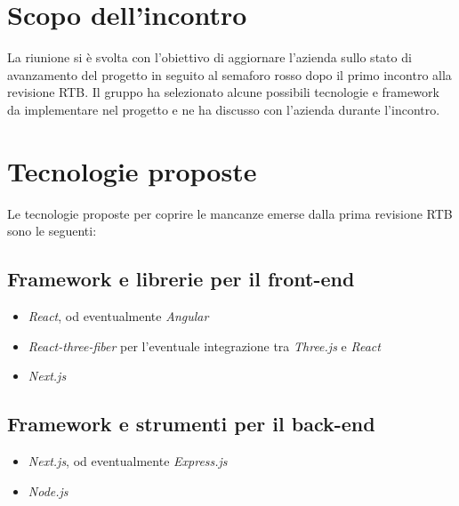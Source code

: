 \section{Scopo dell'incontro} \label{sec:scopo}
La riunione si è svolta con l'obiettivo di aggiornare l'azienda \nomeAzienda \space sullo stato di avanzamento del progetto in seguito al semaforo rosso dopo il primo incontro alla revisione RTB. Il gruppo ha selezionato alcune possibili tecnologie e framework da implementare nel progetto e ne ha discusso con l'azienda durante l'incontro.

\section{Tecnologie proposte} \label{sec:argomenti}
\noindent Le tecnologie proposte per coprire le mancanze emerse dalla prima revisione RTB sono le seguenti:
\subsection{Framework e librerie per il front-end}
\begin{itemize}
    \item \textit{React}, od eventualmente \textit{Angular}
    \item \textit{React-three-fiber} per l'eventuale integrazione tra \textit{Three.js} e \textit{React}
    \item \textit{Next.js}
\end{itemize}
\subsection{Framework e strumenti per il back-end}
\begin{itemize}
    \item \textit{Next.js}, od eventualmente \textit{Express.js}
    \item \textit{Node.js}
\end{itemize}

